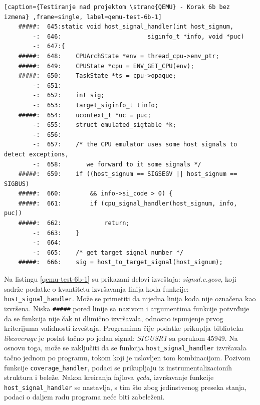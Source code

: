 \documentclass[12pt,oneside]{memoir}
\newcommand{\kod}[1]{\texttt{#1}}
\newcommand{\strano}[1]{\textit{#1}}
\begin{document}
\begin{lstlisting}[caption={Testiranje nad projektom \strano{QEMU} - Korak 6b bez izmena} ,frame=single, label=qemu-test-6b-1]
    #####:  645:static void host_signal_handler(int host_signum,
        -:  646:                        siginfo_t *info, void *puc)
        -:  647:{
    #####:  648:    CPUArchState *env = thread_cpu->env_ptr;
    #####:  649:    CPUState *cpu = ENV_GET_CPU(env);
    #####:  650:    TaskState *ts = cpu->opaque;
        -:  651:
        -:  652:    int sig;
        -:  653:    target_siginfo_t tinfo;
    #####:  654:    ucontext_t *uc = puc;
        -:  655:    struct emulated_sigtable *k;
        -:  656:
        -:  657:    /* the CPU emulator uses some host signals to detect exceptions,
        -:  658:       we forward to it some signals */
    #####:  659:    if ((host_signum == SIGSEGV || host_signum == SIGBUS)
    #####:  660:        && info->si_code > 0) {
    #####:  661:        if (cpu_signal_handler(host_signum, info, puc))
    #####:  662:            return;
        -:  663:    }
        -:  664:
        -:  665:    /* get target signal number */
    #####:  666:    sig = host_to_target_signal(host_signum);
\end{lstlisting}

Na listingu \ref{qemu-test-6b-1} su prikazani delovi izveštaja: \strano{signal.c.gcov}, koji sadrže podatke o kvantitetu izvršavanja linija koda funkcije: \kod{host\_signal\_handler}.
Može se primetiti da nijedna linija koda nije označena kao izvršena. Niska \kod{\#\#\#\#\#} pored linije sa nazivom i argumentima funkcije potvrđuje da se funkcija nije čak ni dlimično izvršavala, odnosno ispunjenje prvog kriterijuma validnosti izveštaja. Programima čije podatke prikuplja biblioteka \strano{libcoverage} je poslat tačno po jedan signal: \strano{SIGUSR1} sa porukom 45949. Na osnovu toga, može se zaključiti da se funkcija \kod{host\_signal\_handler} izvršavala tačno jednom po programu, tokom koji je uslovljen tom kombinacijom. Pozivom funkcije \kod{coverage\_handler}, podaci se prikupljaju iz instrumentalizacionih struktura i beleže. Nakon kreiranja fajlova \strano{gcda}, izvršavanje funkcije \kod{host\_signal\_handler} se nastavlja, s tim što zbog jedinstvenog preseka stanja, podaci o daljem radu programa neće biti zabeleženi. 
\end{document}
